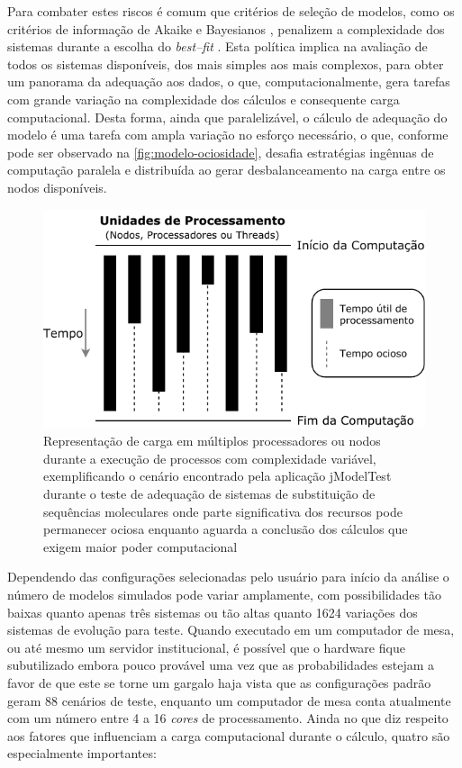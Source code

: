 \documentclass[english,brazilian]{UNISINOSmonografia} %
\newcommand\defaultFigureWidth{0.9}
\begin{document}
Para combater estes riscos é comum que critérios de seleção de modelos, como os critérios de informação de Akaike \cite{Akaike1974} e Bayesianos \cite{Schwarz1978}, penalizem a complexidade dos sistemas durante a escolha do \textit{best--fit} \cite{yang2014molecular}.
Esta política implica na avaliação de todos os sistemas disponíveis, dos mais simples aos mais complexos, para obter um panorama da adequação aos dados, o que, computacionalmente, gera tarefas com grande variação na complexidade dos cálculos e consequente carga computacional.
Desta forma, ainda que paralelizável, o cálculo de adequação do modelo é uma tarefa com ampla variação no esforço necessário, o que, conforme pode ser observado na \autoref{fig:modelo-ociosidade}, desafia estratégias ingênuas de computação paralela e distribuída ao gerar desbalanceamento na carga entre os nodos disponíveis.


\begin{figure}[tb]
	\centering%
	\begin{minipage}{\defaultFigureWidth\textwidth}
		\caption{Representação de carga em múltiplos processadores ou nodos durante a execução de processos com complexidade variável, exemplificando o cenário encontrado pela aplicação jModelTest durante o teste de adequação de sistemas de substituição de sequências moleculares onde parte significativa dos recursos pode permanecer ociosa enquanto aguarda a conclusão dos cálculos que exigem maior poder computacional}
		\label{fig:modelo-ociosidade}
		\centering
		\includegraphics{modelo-ociosidade}
	\end{minipage}
\end{figure}


Dependendo das configurações selecionadas pelo usuário para início da análise o número de modelos simulados pode variar amplamente, com possibilidades tão baixas quanto apenas três sistemas ou tão altas quanto 1624 variações dos sistemas de evolução para teste.
Quando executado em um computador de mesa, ou até mesmo um servidor institucional, é possível que o hardware fique subutilizado embora pouco provável uma vez que as probabilidades estejam a favor de que este se torne um gargalo haja vista que as configurações padrão geram 88 cenários de teste, enquanto um computador de mesa conta atualmente com um número entre 4 a 16 \textit{cores} de processamento.
Ainda no que diz respeito aos fatores que influenciam a carga computacional durante o cálculo, quatro são especialmente importantes:
\end{document}
